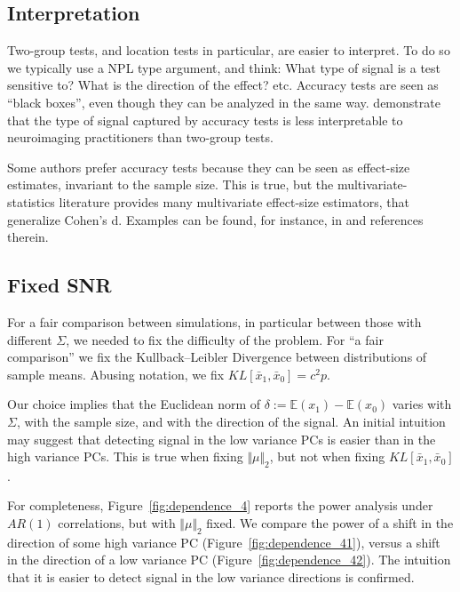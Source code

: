 \documentclass[journal]{IEEEtran}
\begin{document}
\subsection{Interpretation}
Two-group tests, and location tests in particular, are easier to interpret. 
To do so we typically use a NPL type argument, and think:
What type of signal is a test sensitive to?
What is the direction of the effect? etc.
Accuracy tests are seen as ``black boxes'', even though they can be analyzed in the same way. 
\cite{gilron2017s} demonstrate that the type of signal captured by accuracy tests is less interpretable to neuroimaging practitioners than two-group tests. 

Some authors prefer accuracy tests because they can be seen as effect-size estimates, invariant to the sample size. 
This is true, but the multivariate-statistics literature provides many multivariate effect-size estimators, that generalize Cohen's d. 
Examples can be found, for instance, in \cite{stevens2012applied} and references therein. 




\subsection{Fixed SNR}
\label{sec:fix_snr}

For a fair comparison between simulations, in particular between those with different $\Sigma$, we needed to fix the difficulty of the problem.
For ``a fair comparison'' we fix the Kullback–Leibler Divergence between distributions of sample means. Abusing notation, we fix $KL[\bar x_1,\bar x_0]=c^2 p$.

Our choice implies that the Euclidean norm of $\delta:=\mathbb{E}(x_1)-\mathbb{E}(x_0)$ varies with $\Sigma$, with the sample size, and with the direction of the signal.
An initial intuition may suggest that detecting signal in the low variance PCs is easier than in the high variance PCs. 
This is true when fixing $\Vert \mu \Vert_2$, but not when fixing $KL[\bar x_1,\bar x_0]$.

For completeness, Figure~\ref{fig:dependence_4} reports the power analysis under $AR(1)$ correlations, but with $\Vert \mu \Vert_2$ fixed.
We compare the power of a shift in the direction of some high variance PC (Figure~\ref{fig:dependence_41}), versus a shift in the direction of a low variance PC (Figure~\ref{fig:dependence_42}).
The intuition that it is easier to detect signal in the low variance directions is confirmed. 
\end{document}
